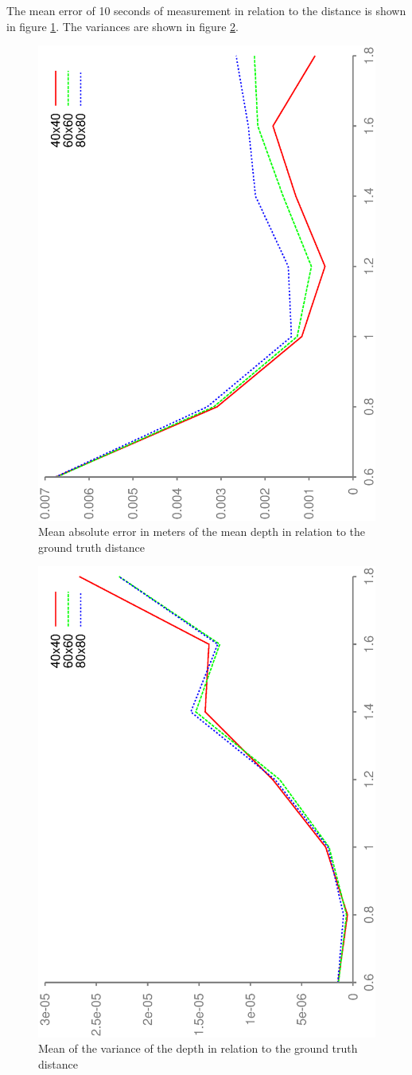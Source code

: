 \documentclass[DIV12,a4paper]{scrartcl}
\begin{document}
The mean error of 10 seconds of measurement in relation to the distance is shown in figure \ref{fig:mean_error}. The variances are shown in figure \ref{fig:variance}.\par
\begin{figure}[h!tbp]
  \centering
  \includegraphics[height=0.8\textwidth,angle=270]{figures/mean_org_error.eps}
  \caption{Mean absolute error in meters of the mean depth in relation to the ground truth distance}
  \label{fig:mean_error}
\end{figure}
\begin{figure}[h!tbp]
  \centering
  \includegraphics[height=0.8\textwidth,angle=270]{figures/mean_org_variance.eps}
  \caption{Mean of the variance of the depth in relation to the ground truth distance}
  \label{fig:variance}
\end{figure}
\end{document}
